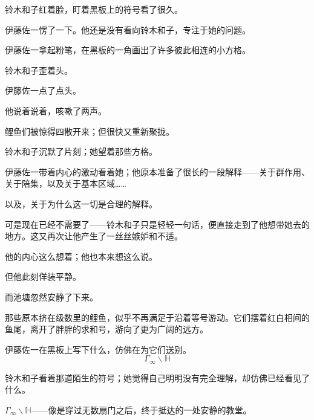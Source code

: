 
铃木和子红着脸，盯着黑板上的符号看了很久。


伊藤佐一愣了一下。他还是没有看向铃木和子，专注于她的问题。


伊藤佐一拿起粉笔，在黑板的一角画出了许多彼此相连的小方格。

铃木和子歪着头。

伊藤佐一点了点头。

他说着说着，咳嗽了两声。

鲤鱼们被惊得四散开来；但很快又重新聚拢。


铃木和子沉默了片刻；她望着那些方格。


伊藤佐一带着内心的激动看着她；他原本准备了很长的一段解释——关于群作用、关于陪集，以及关于基本区域……

以及，关于为什么这一切是合理的解释。

可是现在已经不需要了——铃木和子只是轻轻一句话，便直接走到了他想带她去的地方。这又再次让他产生了一丝丝嫉妒和不适。


他的内心这么想着；他也本来想这么说。


但他此刻佯装平静。

而池塘忽然安静了下来。

那些原本挤在级数里的鲤鱼，似乎不再满足于沿着等号游动。它们摆着红白相间的鱼尾，离开了胖胖的求和号，游向了更为广阔的远方。

伊藤佐一在黑板上写下什么，仿佛在为它们送别。
\[
\Gamma_\infty\backslash\mathbb H
\]


铃木和子看着那道陌生的符号；她觉得自己明明没有完全理解，却仿佛已经看见了什么。

\(\Gamma_\infty\backslash\mathbb H\)——像是穿过无数扇门之后，终于抵达的一处安静的教堂。

